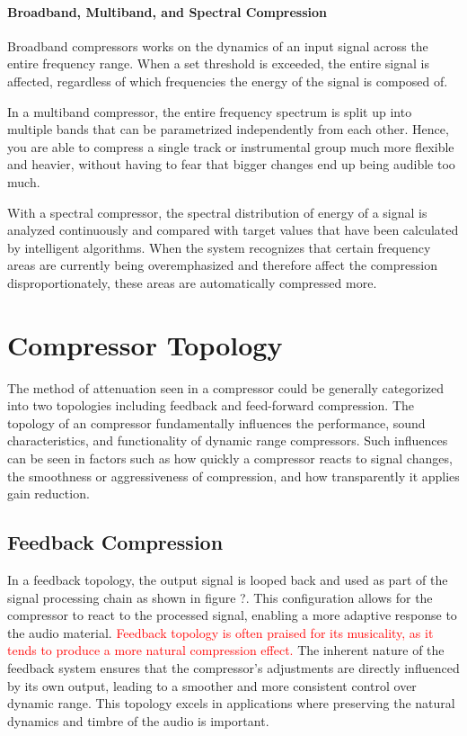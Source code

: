 \documentclass[10pt]{article}
\begin{document}
\begin{multicols*}{2}
            \paragraph{Broadband, Multiband, and Spectral Compression}
                Broadband compressors works on the dynamics of an input signal across the entire frequency range. When a set threshold is exceeded, the entire signal is affected, regardless of which frequencies the energy of the signal is composed of.\par
                In a multiband compressor, the entire frequency spectrum is split up into multiple bands that can be parametrized independently from each other. Hence, you are able to compress a single track or instrumental group much more flexible and heavier, without having to fear that bigger changes end up being audible too much.\par
                With a spectral compressor, the spectral distribution of energy of a signal is analyzed continuously and compared with target values that have been calculated by intelligent algorithms. When the system recognizes that certain frequency areas are currently being overemphasized and therefore affect the compression disproportionately, these areas are automatically compressed more.

        \section{Compressor Topology}
            The method of attenuation seen in a compressor could be generally categorized into two topologies including feedback and feed-forward compression. The topology of an compressor fundamentally influences the performance, sound characteristics, and functionality of dynamic range compressors. Such influences can be seen in factors such as how quickly a compressor reacts to signal changes, the smoothness or aggressiveness of compression, and how transparently it applies gain reduction.
    
            \subsection{Feedback Compression}  
                In a feedback topology, the output signal is looped back and used as part of the signal processing chain as shown in figure ?. This configuration allows for the compressor to react to the processed signal, enabling a more adaptive response to the audio material. \textcolor{red}{Feedback topology is often praised for its musicality, as it tends to produce a more natural compression effect.} The inherent nature of the feedback system ensures that the compressor's adjustments are directly influenced by its own output, leading to a smoother and more consistent control over dynamic range. This topology excels in applications where preserving the natural dynamics and timbre of the audio is important.
                

\end{multicols*}
\end{document}
